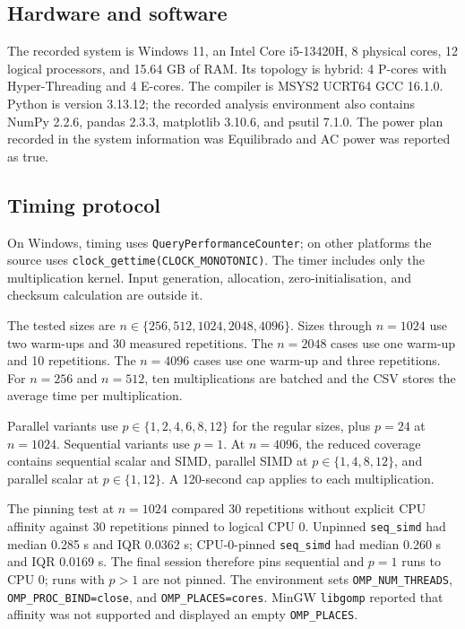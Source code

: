 \documentclass[a4paper,11pt]{article}
\begin{document}
\subsection{Hardware and software}

The recorded system is Windows 11, an Intel Core i5-13420H, 8 physical cores,
12 logical processors, and 15.64 GB of RAM. Its topology is hybrid: 4
P-cores with Hyper-Threading and 4 E-cores. The compiler is MSYS2 UCRT64 GCC
16.1.0. Python is version 3.13.12; the recorded analysis environment also
contains NumPy 2.2.6, pandas 2.3.3, matplotlib 3.10.6, and psutil 7.1.0.
The power plan recorded in the system information was Equilibrado and AC
power was reported as true.

\subsection{Timing protocol}

On Windows, timing uses \texttt{QueryPerformanceCounter}; on other platforms
the source uses \texttt{clock\_gettime(CLOCK\_MONOTONIC)}. The timer includes
only the multiplication kernel. Input generation, allocation,
zero-initialisation, and checksum calculation are outside it.

The tested sizes are $n\in\{256,512,1024,2048,4096\}$. Sizes through
$n=1024$ use two warm-ups and 30 measured repetitions. The $n=2048$ cases
use one warm-up and 10 repetitions. The $n=4096$ cases use one warm-up and
three repetitions. For $n=256$ and $n=512$, ten multiplications are batched
and the CSV stores the average time per multiplication.

Parallel variants use $p\in\{1,2,4,6,8,12\}$ for the regular sizes, plus
$p=24$ at $n=1024$. Sequential variants use $p=1$. At $n=4096$, the
reduced coverage contains sequential scalar and SIMD, parallel SIMD at
$p\in\{1,4,8,12\}$, and parallel scalar at $p\in\{1,12\}$. A 120-second cap
applies to each multiplication.

The pinning test at $n=1024$ compared 30 repetitions without explicit CPU
affinity against 30 repetitions pinned to logical CPU 0. Unpinned
\texttt{seq\_simd} had median 0.285 s and IQR 0.0362 s; CPU-0-pinned
\texttt{seq\_simd} had median 0.260 s and IQR 0.0169 s. The final session
therefore pins sequential and $p=1$ runs to CPU 0; runs with $p>1$ are not
pinned. The environment sets \texttt{OMP\_NUM\_THREADS},
\texttt{OMP\_PROC\_BIND=close}, and \texttt{OMP\_PLACES=cores}. MinGW
\texttt{libgomp} reported that affinity was not supported and displayed an
empty \texttt{OMP\_PLACES}.
\end{document}
